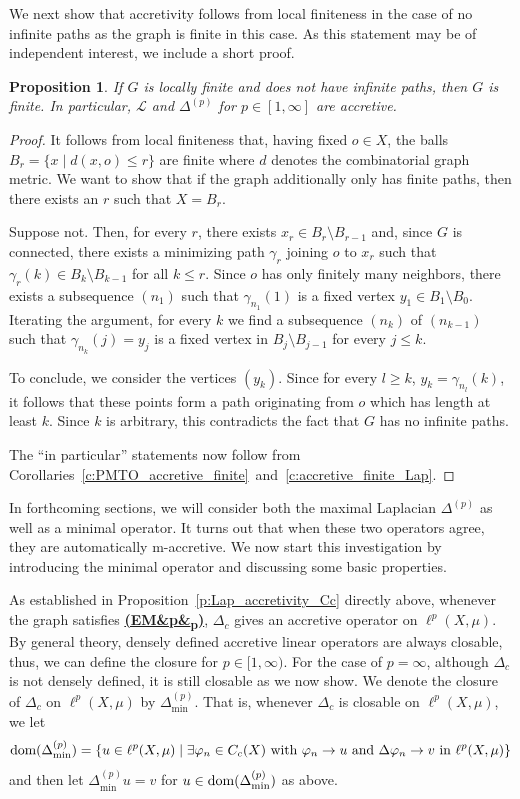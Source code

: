 \documentclass[letterpaper]{article}
\newtheorem{proposition}[lemma]{Proposition}
\theoremstyle{definition}
\theoremstyle{named}
\numberwithin{equation}{section}
\newcommand{\EM}[1][]{\hyperlink{ass:EM}{\textup{\textbf{(EM\ifx&#1&\else\textsubscript{#1}\fi)}}}}
\newcommand{\dom}{\textnormal{dom}} %
\newcommand{\Deltaphi}{\mathcal{L}}
\newcommand{\Dep}{\Delta^{(p)}}
\newcommand{\deltam}{\Delta_{\min}}
\begin{document}
We next show that accretivity follows from local finiteness in the case of no infinite paths
as the graph is finite in this case. As this statement may be of independent interest, we include
a short proof.
\begin{proposition}
If $G$ is locally finite and does not have infinite paths, then $G$ is finite. In particular,
$\Deltaphi$ and $\Dep$ for $p \in [1,\infty]$ are accretive.
\end{proposition}
\begin{proof}
It follows from  local finiteness that, having fixed $o\in X$, the balls $B_r=\{x \mid d(x,o)\leq r \}$ are finite
where $d$ denotes the combinatorial graph metric. 
We want to show that if the graph additionally only has finite paths, 
then there exists an $r$ such that $X=B_r$.
	
Suppose not. Then, for every $r$, there exists $x_r\in B_r \setminus B_{r-1}$ and, since $G$ is connected, there exists a minimizing path $\gamma_r$ joining $o$ to $x_r$ such that $\gamma_r(k)\in B_k\setminus B_{k-1}$ for all $k\leq r$.  Since $o$ has  only finitely many neighbors, there exists a subsequence $(n_1)$ such that  $\gamma_{n_1}(1)$ is a fixed vertex $y_1\in B_1\setminus B_0$. Iterating  the argument, for every $k$ we find a  subsequence $(n_k)$ of  $(n_{k-1})$ such that
	$\gamma_{n_k}(j)=y_j$ is a fixed vertex in $B_j \setminus B_{j-1}$  for every $j\leq k$.
	
To conclude, we consider the  vertices $(y_k)$. 
Since for  every $l\geq k$, $y_k= \gamma_{n_{l}}(k)$,
	it follows that these points form a path originating from $o$ which has length at least $k$. Since $k$ is
	arbitrary, this contradicts the fact that $G$ has no infinite paths.

    The ``in particular'' statements now follow from Corollaries~\ref{c:PMTO_accretive_finite}~and~\ref{c:accretive_finite_Lap}.
\end{proof}



In forthcoming sections, we will consider both the maximal Laplacian $\Dep$ 
as well as a minimal operator. It turns out that when  
these two operators agree, they are automatically m-accretive.
We now start this investigation by introducing the minimal operator and discussing some
basic properties.

As established in Proposition~\ref{p:Lap_accretivity_Cc} directly above, whenever the graph satisfies \EM[p],
$\Delta_c$ gives an accretive operator on $\ell^p(X,\mu)$. By general theory,
densely defined accretive linear operators are always closable, thus, we can define
the closure for $p \in [1,\infty)$. 
For the case of $p =\infty$, although $\Delta_c$ is not densely defined,
it is still closable as we now show.
We denote the closure of $\Delta_c$ on $\ell^p(X,\mu)$ by $\deltam^{(p)}$. That is, whenever $\Delta_c$ is closable
on $\ell^p(X,\mu)$, we let
$$\dom(\deltam^{(p)}) = \{ u \in \ell^p(X,\mu) \mid \exists \varphi_n \in C_c(X) \textup{ with }  \varphi_n  \to u \textup{ and } \Delta \varphi_n \to v  \textup{ in } \ell^p(X,\mu) \} $$
and then let $\deltam^{(p)}u =v$ for $u \in \dom(\deltam^{(p)})$ as above.
\end{document}
